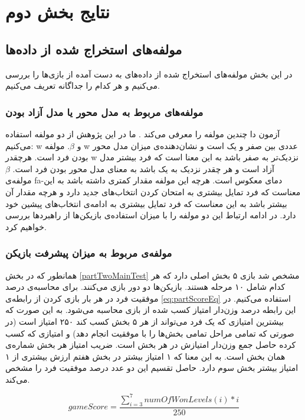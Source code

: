 \documentclass[twoside, a4paper,11pt]{book}
\numberwithin{equation}{chapter}
\numberwithin{table}{chapter}
\numberwithin{figure}{chapter}
\numberwithin{equation}{chapter}
\newcommand{\mls}[1]{\gls{fa-#1}\glsuseri{la-#1}}
\begin{document}
\section{نتایج بخش دوم}

\subsection{مولفه‌های استخراج شده از داده‌ها}
در این بخش مولفه‌های استخراج شده از داده‌های به دست آمده از بازی‌ها را بررسی می‌کنیم و هر کدام را جداگانه تعریف می‌کنیم.
\subsubsection{مولفه‌های مربوط به مدل محور یا مدل آزاد بودن}

آزمون دا چندین مولفه را معرفی می‌کند \cite{daw2011ModelBased}. ما در این پژوهش از دو مولفه استفاده می‌کنیم: w و $\beta$. مولفه w عددی بین صفر و یک است و نشان‌دهنده‌ی میزان مدل محور بودن فرد است. هرچقدر w نزدیک‌تر به صفر باشد به این معنا است که فرد بیشتر مدل آزاد است و هر چقدر نزدیک به یک باشد به معنای مدل محور بودن فرد است. $\beta$ مولفه‌ی \mls{دمای معکوس} است. هرچه این مولفه مقدار کمتری داشته باشد به این معناست که فرد تمایل بیشتری به امتحان کردن انتخاب‌های جدید دارد و هرچه مقدار آن بیشتر باشد به این معناست که فرد تمایل بیشتری به ادامه‌ی انتخاب‌های پیشین خود دارد. در ادامه ارتباط این دو مولفه را با میزان استفاده‌ی بازیکن‌ها از راهبردها بررسی خواهیم کرد. 
\subsubsection{مولفه‌ی مربوط به میزان پیشرفت بازیکن}
همانطور که در بخش \ref{partTwoMainTest} مشخص شد بازی ۵ بخش اصلی دارد که هر کدام شامل ۱۰ مرحله هستند. بازیکن‌ها دو دور بازی می‌کنند. برای محاسبه‌ی درصد موفقیت فرد در هر بار بازی کردن از رابطه‌ی \ref{eq:partScoreEq} استفاده می‌کنیم. در این رابطه درصد وزن‌دار امتیاز کسب شده از بازی محاسبه می‌شود. به این صورت که بیشترین امتیازی که یک فرد می‌تواند از هر ۵ بخش کسب کند ۲۵۰ امتیاز است (در صورتی که تمامی مراحل تمامی بخش‌ها را با موفقیت انجام دهد) و امتیازی که کسب کرده حاصل جمع وزن‌دار امتیازش در هر بخش است. ضریب امتیاز هر بخش شماره‌ی همان بخش است. به این معنا که ۱ امتیاز بیشتر در بخش هفتم ارزش بیشتری از ۱ امتیاز بیشتر بخش سوم دارد. حاصل تقسیم این دو عدد درصد موفقیت فرد را مشخص می‌کند.

\begin{equation}
\label{eq:partScoreEq}
	gameScore = \frac{\sum_{i=3}^{7} numOfWonLevels(i)*i }{250}
\end{equation}
\end{document}
